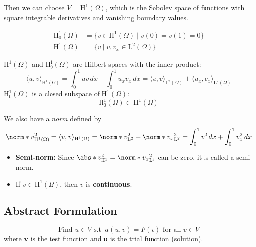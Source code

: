 Then we can choose \(V = \mathrm{H}^1(\Omega)\), which is the Sobolev space of functions with square integrable derivatives and vanishing boundary values.

\begin{align*}
  \mathrm{H}^1_0 (\Omega) & = \{v\in \mathrm{H}^1(\Omega) \mid  v(0) = v(1) = 0\} \\
  \mathrm{H}^1(\Omega)    & = \{v \mid v, v_x \in \mathrm{L}^2(\Omega)\}
\end{align*}

\(\mathrm{H}^1(\Omega)\) and \(\mathrm{H}^1_0 (\Omega)\) are Hilbert spaces with the inner product:
\[
  \langle u, v \rangle_{\mathrm{H}^1(\Omega)} = \int_0^1 u v \,dx + \int_0^1 u_x v_x \,dx = \langle u, v \rangle_{\mathrm{L}^2(\Omega)} + \langle u_x, v_x \rangle_{\mathrm{L}^2(\Omega)}
\]
\(\mathrm{H}^1_0 (\Omega)\) is a closed subspace of \(\mathrm{H}^1(\Omega)\):
\[
  \mathrm{H}^1_0 (\Omega) \subset \mathrm{H}^1(\Omega)
\]

We also have a \emph{norm} defined by:
\[
  \norm*{v}_{\mathrm{H}^1(\Omega)}^2 = \langle v, v \rangle_{\mathrm{H}^1(\Omega)} = \norm*{v}_{\mathrm{L}^2}^2 + \norm*{v_x}_{\mathrm{L}^2}^2 = \int_0^1 v^2 \,dx + \int_0^1 v_x^2 \,dx
\]

\begin{itemize}
  \item \textbf{Semi-norm:} Since \(\abs*{v}_{\mathrm{H}^1}^2 = \norm*{v_x }_{\mathrm{L}^2}^2\) can be zero, it is called a semi-norm.
  \item If \(v\in \mathrm{H}^1(\Omega)\), then \(v\) is \textbf{continuous}.
\end{itemize}

\subsection{Abstract Formulation}
\[
  \boxed{\text{Find }u\in V\text{ s.t. }a(u,v) = F(v)\text{ for all }v\in V}
\]
where \(\symbf{v}\) is the test function and \(\symbf{u}\) is the trial function (solution).

